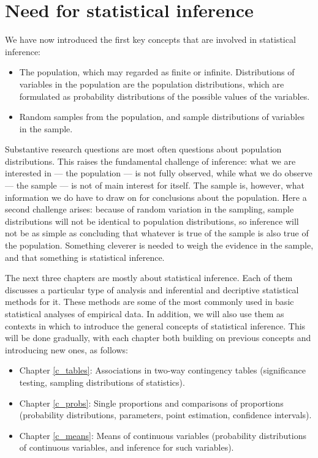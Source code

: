 \section{Need for statistical inference}
\label{s_samples_inference}

We have now introduced the first key concepts that are involved in statistical
inference:
\begin{itemize}
\item
The population, which may regarded as finite or infinite. Distributions
of variables in the population are the population distributions, which
are formulated as probability distributions of the possible values of
the variables.
\item
Random samples from the population, and sample distributions of
variables in the sample.
\end{itemize}
Substantive research questions are most often questions about population
distributions. This raises the fundamental challenge of inference: what
we are interested in --- the population --- is not fully observed, while
what we do observe --- the sample --- is not of main interest for
itself. The sample is, however, what information we do have to draw on
for conclusions about the population. Here a second challenge arises:
because of random variation in the sampling, sample distributions will
not be identical to population distributions, so inference will not be
as simple as concluding that whatever is true of the sample is also true
of the population. Something cleverer is needed to weigh the evidence in
the sample, and that something is statistical inference.

The next three chapters are mostly about statistical inference. Each of
them discusses a particular type of analysis and inferential and
decriptive statistical methods for it. These methods are some of the
most commonly used in basic statistical analyses of empirical data. In
addition, we will also use them as contexts in which to introduce the
general concepts of statistical inference. This will be done gradually,
with each chapter both building on previous concepts and introducing new
ones, as follows:
\begin{itemize}
\item
Chapter \ref{c_tables}: Associations in two-way contingency tables
(significance testing, sampling distributions of statistics).
\item
Chapter \ref{c_probs}: Single proportions and comparisons of
proportions (probability distributions, parameters, point estimation, confidence
intervals).
\item
Chapter \ref{c_means}: Means of continuous variables (probability distributions
of continuous variables, and inference for such variables).
\end{itemize}




